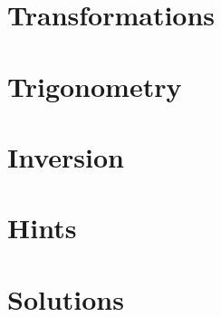 \documentclass[11pt, twoside]{scrbook}
\begin{document}
\chapter{Transformations}
\chapter{Trigonometry}
\chapter{Inversion}

\clearpage
\chapter{Hints}
\makehints
\chapter{Solutions}
\makesoln

\end{document}
